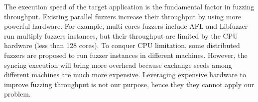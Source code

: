 \begin{table}[t]
\caption{Comparing different fuzzers in terms of source code requirement, snapshot support, Parallel execution and throughput.}
\label{tab:survey}
\end{table}

The execution speed of the target application is the fundamental factor in fuzzing throughput\cite{fuzzan_atc}. 
Existing parallel fuzzers increase their throughput by using more powerful hardware.
For example, multi-cores fuzzers include AFL and Libfuzzer run multiply fuzzers instances, but their throughput are limited by the CPU hardware (less than 128 cores).
To conquer CPU limitation, some distributed fuzzers\cite{clusterfuzz, distributed_fuzz, wtf} are proposed to run fuzzer instances in different machines. However, the syncing execution will bring more overhead because exchange seeds among different machines are much more expensive.  
Leveraging expensive hardware to improve fuzzing throughput is not our purpose, hence they they cannot apply our problem.


